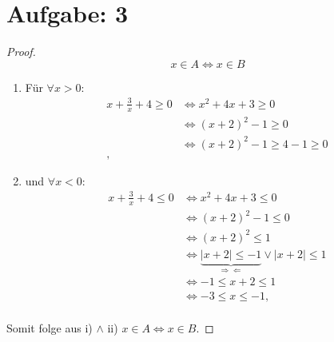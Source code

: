 \documentclass{exam}
\begin{document}
\pagebreak

\section*{Aufgabe: 3}
\begin{proof}
    \begin{displaymath}
        x \in A  \Leftrightarrow x \in B
    \end{displaymath}
    \begin{enumerate}[label=\roman*)]
        \item 	Für $\forall x > 0$:
              \begin{align*}
                  x + \frac{3}{x} + 4 \ge 0 & \Leftrightarrow x^2 +  4x + 3 \ge 0             \\
                                            & \Leftrightarrow {(x + 2)}^2  - 1 \ge 0          \\
                                            & \Leftrightarrow {(x + 2)}^2  - 1 \ge 4 -1 \ge 0 \\,
              \end{align*}

        \item 	und $\forall x < 0$:
              \begin{align*}
                  x + \frac{3}{x} + 4 \le 0 & \Leftrightarrow x^2 +  4x + 3 \le 0                                                                   \\
                                            & \Leftrightarrow {(x + 2)}^2  - 1 \le 0                                                                \\
                                            & \Leftrightarrow {(x + 2)}^2  \le 1                                                                    \\
                                            & \Leftrightarrow \underbrace{ \mid x+2 \mid \le -1}_{\Rightarrow\Leftarrow} \lor \mid x + 2 \mid \le 1 \\
                                            & \Leftrightarrow -1 \le x + 2 \le 1                                                                    \\
                                            & \Leftrightarrow -3 \le x  \le -1,                                                                     \\
              \end{align*}

    \end{enumerate}
    Somit folge aus i) $\land$ ii) $x \in A \Leftrightarrow x \in B$.
\end{proof}
\end{document}
